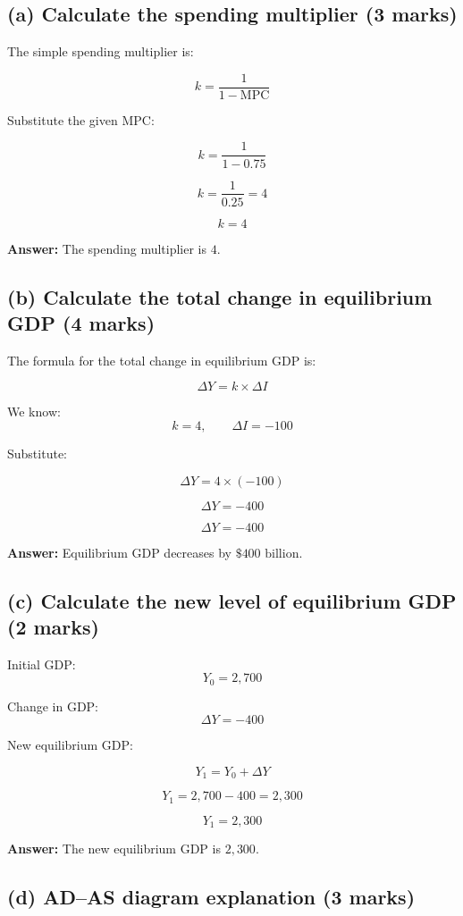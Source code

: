 \documentclass[12pt]{article}
\begin{document}
\subsection*{(a) Calculate the spending multiplier (3 marks)}

The simple spending multiplier is:

\[
k = \frac{1}{1-\text{MPC}}
\]

Substitute the given MPC:

\[
k = \frac{1}{1-0.75}
\]

\[
k = \frac{1}{0.25} = 4
\]

\[
\boxed{k = 4}
\]

\textbf{Answer:} The spending multiplier is \(\boxed{4}\).

\subsection*{(b) Calculate the total change in equilibrium GDP (4 marks)}

The formula for the total change in equilibrium GDP is:

\[
\Delta Y = k \times \Delta I
\]

We know:
\[
k = 4, \qquad \Delta I = -100
\]

Substitute:

\[
\Delta Y = 4 \times (-100)
\]

\[
\Delta Y = -400
\]

\[
\boxed{\Delta Y = -400}
\]

\textbf{Answer:} Equilibrium GDP decreases by \(\boxed{\$400 \text{ billion}}\).

\subsection*{(c) Calculate the new level of equilibrium GDP (2 marks)}

Initial GDP:
\[
Y_0 = 2{,}700
\]

Change in GDP:
\[
\Delta Y = -400
\]

New equilibrium GDP:

\[
Y_1 = Y_0 + \Delta Y
\]

\[
Y_1 = 2{,}700 - 400 = 2{,}300
\]

\[
\boxed{Y_1 = 2{,}300}
\]

\textbf{Answer:} The new equilibrium GDP is \(\boxed{2{,}300}\).

\subsection*{(d) AD--AS diagram explanation (3 marks)}
\end{document}
